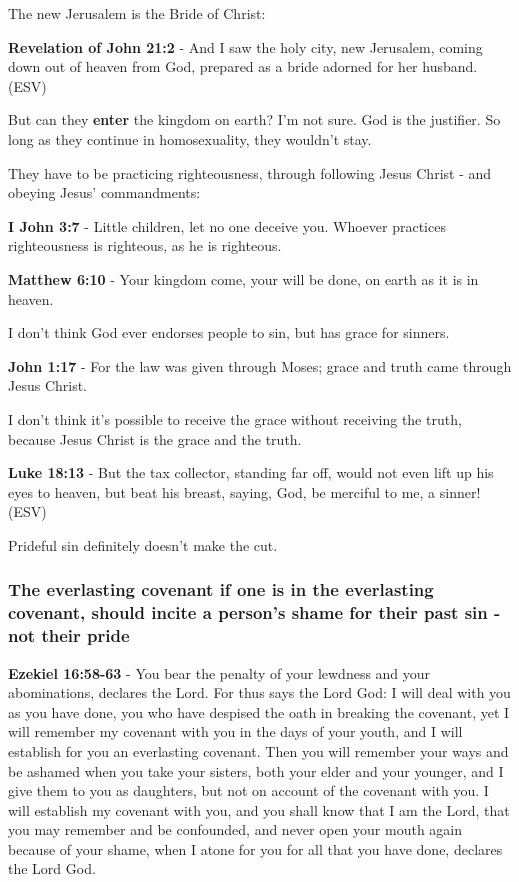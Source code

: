 \documentclass[11pt]{article}
\begin{document}
The new Jerusalem is the Bride of Christ:

\textbf{Revelation of John 21:2} - And I saw the holy city, new Jerusalem, coming down out of heaven from God, prepared as a bride adorned for her husband. (ESV)

But can they \textbf{enter} the kingdom on earth? I'm not sure.
God is the justifier.
So long as they continue in homosexuality, they wouldn't stay.

They have to be practicing righteousness, through following Jesus Christ - and obeying Jesus' commandments:

\textbf{I John 3:7} - Little children, let no one deceive you. Whoever practices righteousness is righteous, as he is righteous.

\textbf{Matthew 6:10} - Your kingdom come, your will be done, on earth as it is in heaven.

I don't think God ever endorses people to sin, but has grace for sinners.

\textbf{John 1:17} - For the law was given through Moses; grace and truth came through Jesus Christ.

I don't think it's possible to receive the grace without receiving the truth, because Jesus Christ is the grace and the truth.

\textbf{Luke 18:13} - But the tax collector, standing far off, would not even lift up his eyes to heaven, but beat his breast, saying, God, be merciful to me, a sinner! (ESV)

Prideful sin definitely doesn't make the cut.

\subsubsection{The everlasting covenant if one is in the everlasting covenant, should incite a person's shame for their past sin - not their pride}
\label{sec:org54cfb50}
\textbf{Ezekiel 16:58-63} - You bear the penalty of your lewdness and your abominations, declares the Lord.  For thus says the Lord God: I will deal with you as you have done, you who have despised the oath in breaking the covenant, yet I will remember my covenant with you in the days of your youth, and I will establish for you an everlasting covenant.  Then you will remember your ways and be ashamed when you take your sisters, both your elder and your younger, and I give them to you as daughters, but not on account of the covenant with you.  I will establish my covenant with you, and you shall know that I am the Lord, that you may remember and be confounded, and never open your mouth again because of your shame, when I atone for you for all that you have done, declares the Lord God.
\end{document}
